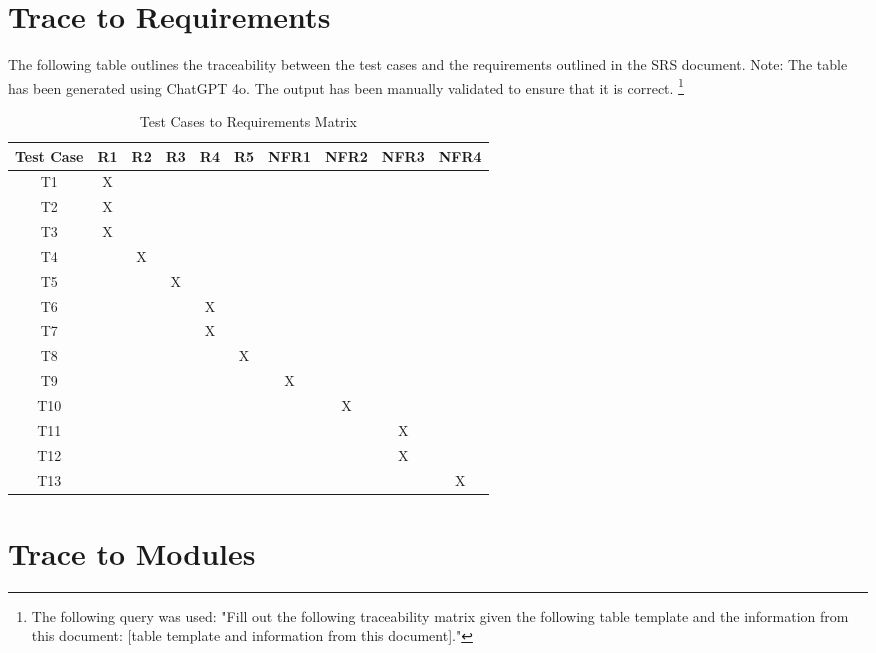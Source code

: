 \documentclass[12pt, titlepage]{article}
\begin{document}
\section{Trace to Requirements}

The following table outlines the traceability between the test cases and the
requirements outlined in the SRS document. Note: The table has been generated
using ChatGPT 4o. The output has been manually validated to ensure that it is
correct. \footnote{The following query was used: "Fill out the following traceability
matrix given the following table template and the information from this document: [table template and information from this document]."}

\begin{table}[h]
\centering
\begin{tabular}{|c|c|c|c|c|c|c|c|c|c|}
\hline
\textbf{Test Case} & \textbf{R1} & \textbf{R2} & \textbf{R3} & \textbf{R4} & \textbf{R5} & \textbf{NFR1} & \textbf{NFR2} & \textbf{NFR3} & \textbf{NFR4} \\ \hline
T1 & X &   &   &   &   &   &   &   &   \\ \hline
T2 & X &   &   &   &   &   &   &   &   \\ \hline
T3 & X &   &   &   &   &   &   &   &   \\ \hline
T4 &   & X &   &   &   &   &   &   &   \\ \hline
T5 &   &   & X &   &   &   &   &   &   \\ \hline
T6 &   &   &   & X &   &   &   &   &   \\ \hline
T7 &   &   &   & X &   &   &   &   &   \\ \hline
T8 &   &   &   &   & X &   &   &   &   \\ \hline
T9 &   &   &   &   &   & X &   &   &   \\ \hline
T10 &  &   &   &   &   &   & X &   &   \\ \hline
T11 &  &   &   &   &   &   &   & X &   \\ \hline
T12 &  &   &   &   &   &   &   & X &   \\ \hline
T13 &  &   &   &   &   &   &   &   & X \\ \hline
\end{tabular}
\caption{Test Cases to Requirements Matrix}
\label{tab:test-requirements-matrix}
\end{table}

\section{Trace to Modules}		
\end{document}
